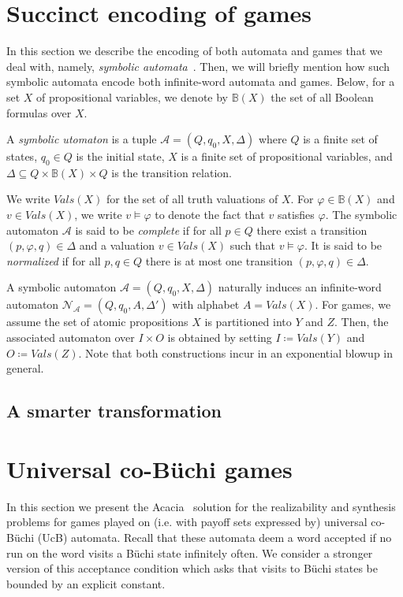 \documentclass[runningheads,a4paper,draft]{llncs}
\newcommand{\Vals}{\mathit{Vals}}
\newcommand{\calA}{\mathcal{A}}
\newcommand{\calN}{\mathcal{N}}
\begin{document}
\section{Succinct encoding of games}
In this section we describe the encoding of both automata and games that we
deal with, namely, \emph{symbolic automata}~\cite{dv17}. Then, we will briefly mention how
such symbolic automata encode both infinite-word automata and games. Below,
for a set $X$ of propositional variables, we denote by $\mathbb{B}(X)$ the set of all
Boolean formulas over $X$.
\begin{definition}
  A \emph{symbolic utomaton} is a tuple $\calA = (Q,q_0,X,\Delta)$ where $Q$
  is a finite set of states, $q_0 \in Q$ is the initial state, $X$ is a finite
  set of propositional variables, and $\Delta \subseteq Q \times
  \mathbb{B}(X) \times Q$ is the transition relation.
\end{definition}
%
We write $\Vals(X)$ for the set of all truth valuations of $X$. For $\varphi
\in \mathbb{B}(X)$ and $v \in \Vals(X)$, we write $v \models \varphi$ to
denote the fact that $v$ satisfies $\varphi$. The symbolic automaton $\calA$
is said to be \emph{complete} if for all $p \in Q$ there exist a transition
$(p,\varphi,q) \in \Delta$ and a valuation $v \in \Vals(X)$ such that $v
\models \varphi$. It is said to be \emph{normalized} if for all $p,q \in Q$
there is at most one transition $(p,\varphi,q) \in \Delta$.

A symbolic automaton $\calA = (Q,q_0,X,\Delta)$ naturally induces an infinite-word automaton
$\calN_\calA = (Q,q_0,A,\Delta')$ with alphabet $A = \Vals(X)$. For games, we
assume the set of atomic propositions $X$ is partitioned into $Y$ and $Z$.
Then, the associated automaton over $I \times O$ is obtained by setting $I
\coloneqq \Vals(Y)$ and $O \coloneqq \Vals(Z)$. Note that both constructions
incur in an exponential blowup in general.

\subsection{A smarter transformation}



\section{Universal co-B\"uchi games}
In this section we present the Acacia~\cite{acacia} solution for the
realizability and synthesis problems for games played on (i.e. with payoff sets
expressed by) universal co-B\"uchi (UcB) automata.  Recall that these automata
deem a word accepted if no run on the word visits a B\"uchi state infinitely
often.  We consider a stronger version of this acceptance condition which asks
that visits to B\"uchi states be bounded by an explicit constant.
\end{document}
